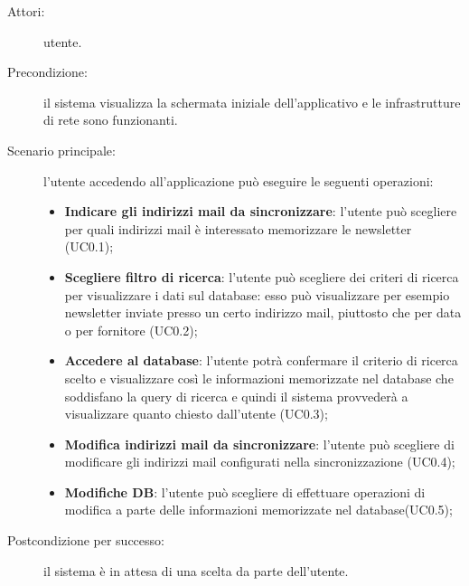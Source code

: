 \begin{description}
\item[Attori:]{utente.}
\item[Precondizione:]{il sistema visualizza la schermata iniziale dell\textquoteright{}applicativo e le infrastrutture di rete sono funzionanti.}
\item[Scenario principale:]{l\textquoteright{}utente accedendo all\textquoteright{}applicazione pu\`{o} eseguire le seguenti operazioni:
	\begin{itemize}
	\item \textbf{Indicare gli indirizzi mail da sincronizzare}: l\textquoteright{}utente pu\`{o} scegliere per quali indirizzi mail \`{e} interessato memorizzare le newsletter (UC0.1);
	\item \textbf{Scegliere filtro di ricerca}: l\textquoteright{}utente pu\`{o} scegliere dei criteri di ricerca per visualizzare i dati sul database: esso pu\`{o} visualizzare per esempio newsletter inviate presso un certo indirizzo mail, piuttosto che per data o per fornitore (UC0.2);
	\item \textbf{Accedere al database}: l\textquoteright{}utente potr\`{a} confermare il criterio di ricerca scelto e visualizzare cos\`{i} le informazioni memorizzate nel database che soddisfano la query di ricerca e quindi il sistema provveder\`{a} a visualizzare quanto chiesto dall\textquoteright{}utente (UC0.3);
	\item \textbf{Modifica indirizzi mail da sincronizzare}: l\textquoteright{}utente pu\`{o} scegliere di modificare gli indirizzi mail configurati nella sincronizzazione (UC0.4);
	\item \textbf{Modifiche DB}: l\textquoteright{}utente pu\`{o} scegliere di effettuare operazioni di modifica a parte delle informazioni memorizzate nel database(UC0.5);	
	\end{itemize}}
\item[Postcondizione per successo:]{il sistema \`{e} in attesa di una scelta da parte dell\textquoteright{}utente.}
\end{description}

